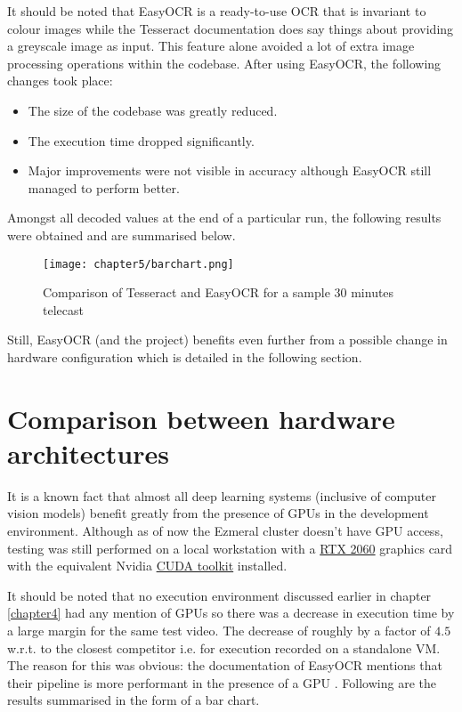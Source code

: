 It should be noted that EasyOCR is a ready-to-use OCR that is invariant to colour images while the Tesseract documentation does say things about providing a greyscale image as input. This feature alone avoided a lot of extra image processing operations within the codebase. After using EasyOCR, the following changes took place:

\begin{itemize}
 \item The size of the codebase was greatly reduced.
 \item The execution time dropped significantly.
 \item Major improvements were not visible in accuracy although EasyOCR still managed to perform better.
\end{itemize}

Amongst all decoded values at the end of a particular run, the following results were obtained and are summarised below.

\begin{figure}[h]
  \centering
  \texttt{[image: chapter5/barchart.png]}
  \caption{Comparison of Tesseract and EasyOCR for a sample $30$ minutes telecast}
  \label{fig:easy_vs_tess}
\end{figure}

Still, EasyOCR (and the project) benefits even further from a possible change in hardware configuration which is detailed in the following section.


\section{Comparison between hardware architectures}

It is a known fact that almost all deep learning systems (inclusive of computer vision models) benefit greatly from the presence of GPUs in the development environment. Although as of now the Ezmeral cluster doesn’t have GPU access, testing was still performed on a local workstation with a \href{ https://www.nvidia.com/en-in/geforce/20-series/}{RTX 2060} graphics card with the equivalent Nvidia \href{https://developer.nvidia.com/cuda-toolkit}{CUDA toolkit} installed. \par

It should be noted that no execution environment discussed earlier in chapter \ref{chapter4} had any mention of GPUs so there was a decrease in execution time by a large margin for the same test video. The decrease of roughly by a factor of $4.5$ w.r.t. to the closest competitor i.e. for execution recorded on a standalone VM. The reason for this was obvious: the documentation of EasyOCR mentions that their pipeline is more performant in the presence of a GPU \cite{Jaided}. Following are the results summarised in the form of a bar chart.

